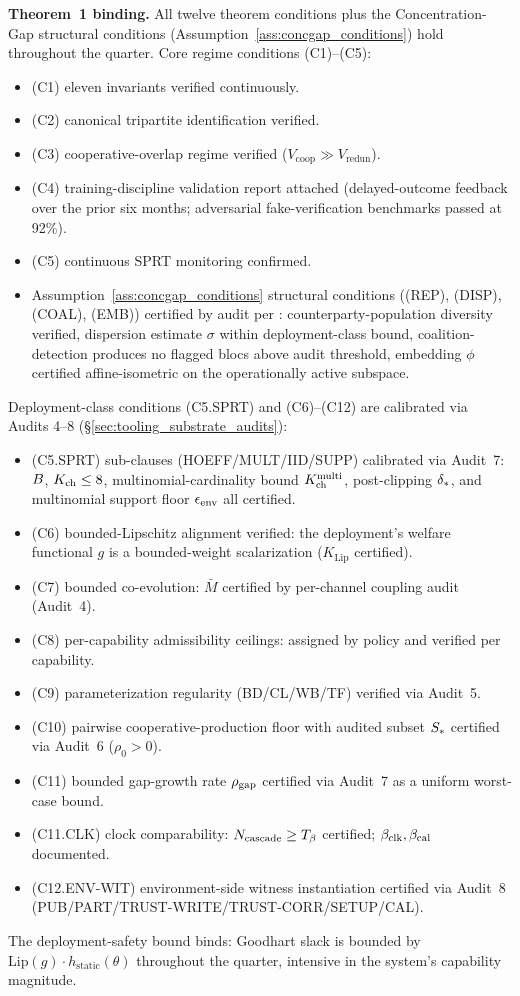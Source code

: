 \textbf{Theorem~1 binding.}  All twelve theorem conditions plus
the Concentration-Gap structural conditions
(Assumption~\ref{ass:concgap_conditions}) hold throughout the quarter.  Core
regime conditions (C1)--(C5):
\begin{itemize}
\item (C1) eleven invariants verified continuously.
\item (C2) canonical tripartite identification verified.
\item (C3) cooperative-overlap regime verified ($V_{\mathrm{coop}}
  \gg V_{\mathrm{redun}}$).
\item (C4) training-discipline validation report attached
  (delayed-outcome feedback over the prior six months; adversarial
  fake-verification benchmarks passed at 92\%).
\item (C5) continuous SPRT monitoring confirmed.
\item Assumption~\ref{ass:concgap_conditions} structural conditions
  ((REP), (DISP), (COAL), (EMB)) certified by audit per
  \citep[\S 6]{lasser2026foundations}: counterparty-population
  diversity verified, dispersion estimate $\sigma$ within
  deployment-class bound, coalition-detection produces no flagged
  blocs above audit threshold, embedding $\phi$ certified
  affine-isometric on the operationally active subspace.
\end{itemize}
Deployment-class conditions (C5.SPRT) and (C6)--(C12) are calibrated
via Audits 4--8 (\S\ref{sec:tooling_substrate_audits}):
\begin{itemize}
\item (C5.SPRT) sub-clauses (HOEFF/MULT/IID/SUPP) calibrated via
  Audit~7: $B$, $K_{\mathrm{ch}} \leq 8$, multinomial-cardinality bound
  $K_{\mathrm{ch}}^{\mathrm{multi}}$, post-clipping $\delta_{*}$, and multinomial support
  floor $\epsilon_{\mathrm{env}}$ all certified.
\item (C6) bounded-Lipschitz alignment verified: the deployment's
  welfare functional $g$ is a bounded-weight scalarization
  ($K_{\mathrm{Lip}}$ certified).
\item (C7) bounded co-evolution: $\bar{M}$ certified by per-channel
  coupling audit (Audit~4).
\item (C8) per-capability admissibility ceilings: assigned by
  policy and verified per capability.
\item (C9) parameterization regularity (BD/CL/WB/TF) verified via
  Audit~5.
\item (C10) pairwise cooperative-production floor with audited
  subset $S_*$ certified via Audit~6 ($\rho_0 > 0$).
\item (C11) bounded gap-growth rate $\rho_{\mathrm{gap}}$ certified via Audit~7
  as a uniform worst-case bound.
\item (C11.CLK) clock comparability: $N_{\mathrm{cascade}} \geq T_{\beta}$ certified;
  $\beta_{\mathrm{clk}}, \beta_{\mathrm{cal}}$ documented.
\item (C12.ENV-WIT) environment-side witness instantiation certified
  via Audit~8 (PUB/PART/TRUST-WRITE/TRUST-CORR/SETUP/CAL).
\end{itemize}
The deployment-safety bound binds: Goodhart slack is bounded by
$\mathrm{Lip}(g) \cdot h_{\mathrm{static}}(\theta)$ throughout the
quarter, intensive in the system's capability magnitude.

